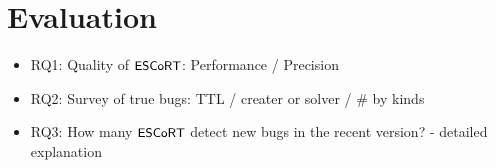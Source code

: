 \section{Evaluation}\label{sec:eval}

\begin{itemize}
  \item RQ1: Quality of $\textsf{\small ESCoRT}$: Performance / Precision
  \item RQ2: Survey of true bugs: TTL / creater or solver / \# by kinds
  \item RQ3: How many $\textsf{\small ESCoRT}$ detect new bugs in the recent version? - detailed
    explanation
\end{itemize}
